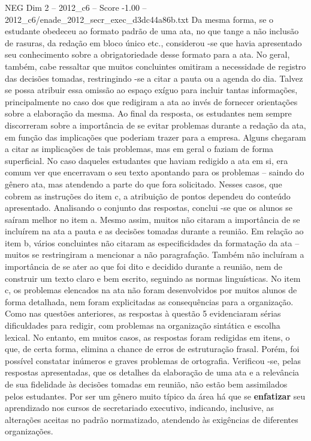 \begin{textsample}{NEG Dim 2 – 2012\_c6 – Score -1.00 – 2012\_c6/enade\_2012\_secr\_exec\_d3dc44a86b.txt}
Da mesma forma, se o estudante obedeceu ao formato padrão de uma ata, no que tange a não inclusão de rasuras, da redação em bloco único etc., considerou -se que havia apresentado seu conhecimento sobre a obrigatoriedade desse formato para a ata.
No geral, também, cabe ressaltar que muitos concluintes omitiram a necessidade de registro das decisões tomadas, restringindo -se a citar a pauta ou a agenda do dia.
Talvez se possa atribuir essa omissão ao espaço exíguo para incluir tantas informações, principalmente no caso dos que redigiram a ata ao invés de fornecer orientações sobre a elaboração da mesma.
Ao final da resposta, os estudantes nem sempre discorreram sobre a importância de se evitar problemas durante a redação da ata, em função das implicações que poderiam trazer para a empresa.
Alguns chegaram a citar as implicações de tais problemas, mas em geral o faziam de forma superficial.
No caso daqueles estudantes que haviam redigido a ata em si, era comum ver que encerravam o seu texto apontando para os problemas – saindo do gênero ata, mas atendendo a parte do que fora solicitado.
Nesses casos, que cobrem as instruções do item c, a atribuição de pontos dependeu do conteúdo apresentado.
Analisando o conjunto das respostas, conclui -se que os alunos se saíram melhor no item a.
Mesmo assim, muitos não citaram a importância de se incluírem na ata a pauta e as decisões tomadas durante a reunião.
Em relação ao item b, vários concluintes não citaram as especificidades da formatação da ata – muitos se restringiram a mencionar a não paragrafação.
Também não incluíram a importância de se ater ao que foi dito e decidido durante a reunião, nem de construir um texto claro e bem escrito, seguindo as normas linguísticas.
No item c, os problemas elencados na ata não foram desenvolvidos por muitos alunos de forma detalhada, nem foram explicitadas as consequências para a organização.
Como nas questões anteriores, as respostas à questão 5 evidenciaram sérias dificuldades para redigir, com problemas na organização sintática e escolha lexical.
No entanto, em muitos casos, as respostas foram redigidas em itens, o que, de certa forma, elimina a chance de erros de estruturação frasal.
Porém, foi possível constatar inúmeros e graves problemas de ortografia.
Verificou -se, pelas respostas apresentadas, que os detalhes da elaboração de uma ata e a relevância de sua fidelidade às decisões tomadas em reunião, não estão bem assimilados pelos estudantes.
Por ser um gênero muito típico da área há que se \textbf{enfatizar} seu aprendizado nos cursos de secretariado executivo, indicando, inclusive, as alterações aceitas no padrão normatizado, atendendo às exigências de diferentes organizações.

\end{textsample}
